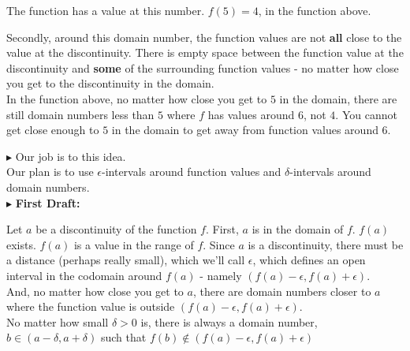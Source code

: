 \documentclass{ximera}
\begin{document}
The function has a value at this number. $f(5) = 4$, in the function above.




Secondly, around this domain number, the function values are not \textbf{\textcolor{purple!85!blue}{all}} close to the value at the discontinuity. There is empty space between the function value at the discontinuity and \textbf{\textcolor{purple!85!blue}{some}} of the surrounding function values - no matter how close you get to the discontinuity in the domain. \\


In the function above, no matter how close you get to $5$ in the domain, there are still domain numbers less than $5$ where $f$ has values around $6$, not $4$. You cannot get close enough to $5$ in the domain to get away from function values around $6$.



\textbf{\textcolor{red!90!darkgray}{$\blacktriangleright$}} Our job is to  this idea. \\


Our plan is to use $\epsilon$-intervals around function values and $\delta$-intervals around domain numbers.\\




$\blacktriangleright$ \textbf{First Draft:}

Let $a$ be a discontinuity of the function $f$.  First, $a$ is in the domain of $f$. $f(a)$ exists.  $f(a)$ is a value in the range of $f$. Since $a$ is a discontinuity, there must be a distance (perhaps really small), which we'll call $\epsilon$, which defines an open interval in the codomain around $f(a)$ - namely $(f(a)-\epsilon, f(a)+\epsilon)$.  \\


And, no matter how close you get to $a$, there are domain numbers closer to $a$ where the function value is outside $(f(a)-\epsilon, f(a)+\epsilon)$. \\



No matter how small $\delta>0$ is, there is always a domain number, $b \in (a-\delta, a+\delta)$ such that $ f(b) \not\in(f(a)-\epsilon, f(a)+\epsilon)$ \\
\end{document}
